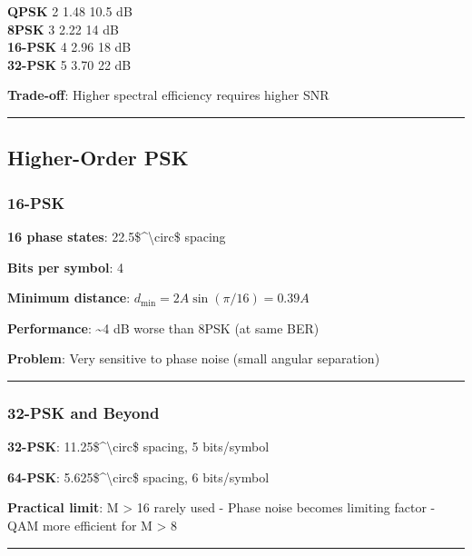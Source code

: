 \textbf{QPSK} \textbar{} 2 \textbar{} 1.48 \textbar{} 10.5 dB
\textbar{}\\
\textbf{8PSK} \textbar{} 3 \textbar{} 2.22 \textbar{} 14 dB \textbar{}\\
\textbf{16-PSK} \textbar{} 4 \textbar{} 2.96 \textbar{} 18 dB
\textbar{}\\
\textbf{32-PSK} \textbar{} 5 \textbar{} 3.70 \textbar{} 22 dB \textbar{}

\textbf{Trade-off}: Higher spectral efficiency requires higher SNR

\begin{center}\rule{0.5\linewidth}{0.5pt}\end{center}

\subsection{Higher-Order PSK}\label{higher-order-psk}

\subsubsection{16-PSK}\label{psk}

\textbf{16 phase states}: 22.5\$\^{}\textbackslash circ\$ spacing

\textbf{Bits per symbol}: 4

\textbf{Minimum distance}: \(d_{\min} = 2A\sin(\pi/16) = 0.39A\)

\textbf{Performance}: \textasciitilde4 dB worse than 8PSK (at same BER)

\textbf{Problem}: Very sensitive to phase noise (small angular
separation)

\begin{center}\rule{0.5\linewidth}{0.5pt}\end{center}

\subsubsection{32-PSK and Beyond}\label{psk-and-beyond}

\textbf{32-PSK}: 11.25\$\^{}\textbackslash circ\$ spacing, 5 bits/symbol

\textbf{64-PSK}: 5.625\$\^{}\textbackslash circ\$ spacing, 6 bits/symbol

\textbf{Practical limit}: M \textgreater{} 16 rarely used - Phase noise
becomes limiting factor - QAM more efficient for M \textgreater{} 8

\begin{center}\rule{0.5\linewidth}{0.5pt}\end{center}

